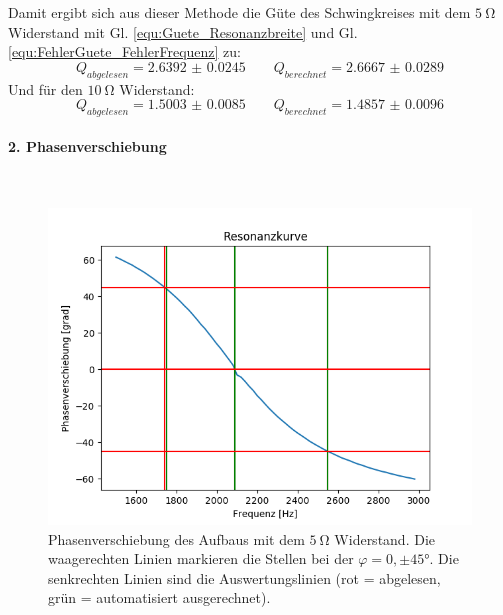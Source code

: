 \documentclass[12pt,a4paper]{article}
\begin{document}
Damit ergibt sich aus dieser Methode die Güte des Schwingkreises mit dem $\SI{5}{\ohm}$ Widerstand mit Gl. \ref{equ:Guete_Resonanzbreite} und Gl. \ref{equ:FehlerGuete_FehlerFrequenz} zu:
\begin{equation*}
Q_{abgelesen} = \num{2.6392(245)} \qquad Q_{berechnet} = \num{2.6667(289)}
\end{equation*}
Und für den $\SI{10}{\ohm}$ Widerstand:
\begin{equation*}
Q_{abgelesen} = \num{1.5003(85)} \qquad Q_{berechnet} = \num{1.4857(96)}
\end{equation*}

\paragraph{2. Phasenverschiebung}\mbox{}\\
\begin{figure}
\centering
\includegraphics[scale=0.8]{Bilder/Serie_Phasenverschiebung_A_5.png}
\caption{Phasenverschiebung des Aufbaus mit dem $\SI{5}{\ohm}$ Widerstand. Die waagerechten Linien markieren die Stellen bei der $\varphi = 0, \pm \ang{45}$. Die senkrechten Linien sind die Auswertungslinien (rot = abgelesen, grün = automatisiert ausgerechnet).}
\label{fig:Serie_Phasenverschiebung_A_5}
\end{figure}
\end{document}
